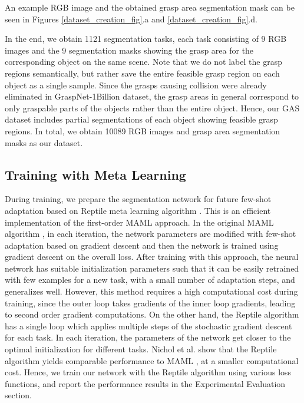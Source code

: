 \documentclass[letterpaper]{article} %
\begin{document}
An example RGB image and the obtained grasp area segmentation mask can be seen in Figures \ref{dataset_creation_fig}.a and \ref{dataset_creation_fig}.d.

In the end, we obtain 1121 segmentation tasks, each task consisting of 9 RGB images and the 9 segmentation masks showing the grasp area for the corresponding object on the same scene. Note that we do not label the grasp regions semantically, but rather save the entire feasible grasp region on each object as a single sample. Since the grasps causing collision were already eliminated in GraspNet-1Billion dataset, the grasp areas in general correspond to only graspable parts of the objects rather than the entire object. Hence, our GAS dataset includes partial segmentations of each object showing feasible grasp regions. In total, we obtain 10089 RGB images and grasp area segmentation masks as our dataset.

\subsection{Training with Meta Learning}
\label{maml_section}

During training, we prepare the segmentation network for future few-shot adaptation based on Reptile meta learning algorithm \cite{nichol2018reptile}. This is an efficient implementation of the first-order MAML approach. In the original MAML algorithm \cite{finn2017model}, in each iteration, the network parameters are modified with few-shot adaptation based on gradient descent and then the network is trained using gradient descent on the overall loss. After training with this approach, the neural network has suitable initialization parameters such that it can be easily retrained with few examples for a new task, with a small number of adaptation steps, and generalizes well. However, this method requires a high computational cost during training, since the outer loop takes gradients of the inner loop gradients, leading to second order gradient computations. On the other hand, the Reptile algorithm has a single loop which applies multiple steps of the stochastic gradient descent for each task. In each iteration, the parameters of the network get closer to the optimal initialization for different tasks. Nichol et al. \cite{nichol2018reptile} show that the Reptile algorithm yields comparable performance to MAML  \cite{finn2017model}, at a smaller computational cost. Hence, we train our network with the Reptile algorithm using various loss functions, and report the performance results in the Experimental Evaluation section.
\end{document}
